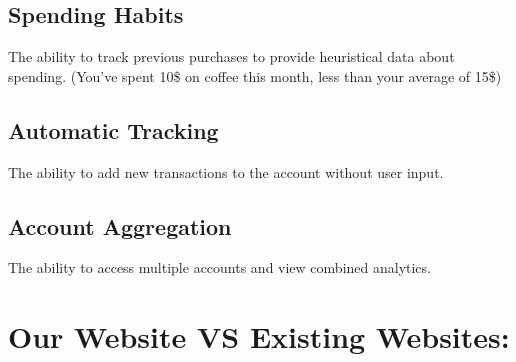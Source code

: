 \documentclass[12pt]{article}
\begin{document}
\subsection{Spending Habits}
The ability to track previous purchases to provide heuristical data about spending. (You've spent 10\$ on coffee this month, less than your average of 15\$)
\subsection{Automatic Tracking}
The ability to add new transactions to the account without user input.
\subsection{Account Aggregation}
The ability to access multiple accounts and view combined analytics.

\section{Our Website VS Existing Websites:}
\end{document}

